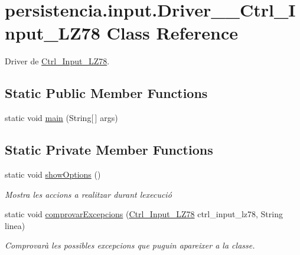 \hypertarget{classpersistencia_1_1input_1_1Driver____Ctrl__Input__LZ78}{}\section{persistencia.\+input.\+Driver\+\_\+\+\_\+\+Ctrl\+\_\+\+Input\+\_\+\+L\+Z78 Class Reference}
\label{classpersistencia_1_1input_1_1Driver____Ctrl__Input__LZ78}


Driver de \hyperlink{classpersistencia_1_1input_1_1Ctrl__Input__LZ78}{Ctrl\+\_\+\+Input\+\_\+\+L\+Z78}.  


\subsection*{Static Public Member Functions}
\begin{DoxyCompactItemize}
\item 
static void \hyperlink{classpersistencia_1_1input_1_1Driver____Ctrl__Input__LZ78_adb756847df72081fa229549543e03569}{main} (String\mbox{[}$\,$\mbox{]} args)
\end{DoxyCompactItemize}
\subsection*{Static Private Member Functions}
\begin{DoxyCompactItemize}
\item 
static void \hyperlink{classpersistencia_1_1input_1_1Driver____Ctrl__Input__LZ78_af3c2d5d864dec2d98d3d57c474f9c2b4}{show\+Options} ()
\begin{DoxyCompactList}\small\item\em Mostra les accions a realitzar durant l\textquotesingle{}execució \end{DoxyCompactList}\item 
static void \hyperlink{classpersistencia_1_1input_1_1Driver____Ctrl__Input__LZ78_a285493e74dff1f6b2520f010f75b850c}{comprovar\+Excepcions} (\hyperlink{classpersistencia_1_1input_1_1Ctrl__Input__LZ78}{Ctrl\+\_\+\+Input\+\_\+\+L\+Z78} ctrl\+\_\+input\+\_\+lz78, String linea)
\begin{DoxyCompactList}\small\item\em Comprovarà les possibles excepcions que puguin apareixer a la classe. \end{DoxyCompactList}\end{DoxyCompactItemize}


